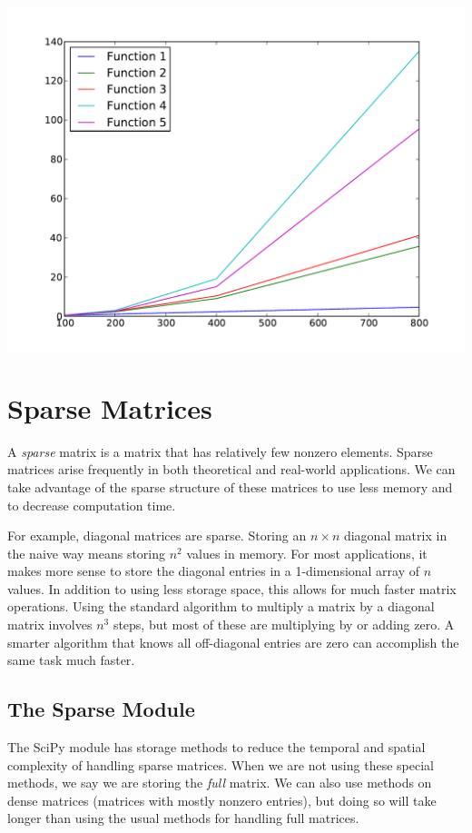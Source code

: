 \begin{problem}
\centering
\includegraphics[width=\textwidth]{complexity_problem.pdf}

\end{problem}

\section*{Sparse Matrices}
A \emph{sparse} matrix is a matrix that has relatively few nonzero elements. 
Sparse matrices arise frequently in both theoretical and real-world applications. 
We can take advantage of the sparse structure of these matrices to use less memory and to decrease computation time.

For example, diagonal matrices are sparse. 
Storing an $n \times n$ diagonal matrix in the naive way means storing $n^2$ values in memory. 
For most applications, it makes more sense to store the diagonal entries in a 1-dimensional array of $n$ values. 
In addition to using less storage space, this allows for much faster matrix operations. 
Using the standard algorithm to multiply a matrix by a diagonal matrix involves $n^3$ steps, but most of these are multiplying by or adding zero. 
A smarter algorithm that knows all off-diagonal entries are zero can accomplish the same task much faster.

\subsection*{The Sparse Module}
The SciPy module  has storage methods to reduce the temporal and spatial complexity of handling sparse matrices.  
When we are not using these special methods, we say we are storing the \emph{full} matrix. 
We can also use  methods on dense matrices (matrices with mostly nonzero entries), but doing so will take longer than using the usual methods for handling full matrices. 

